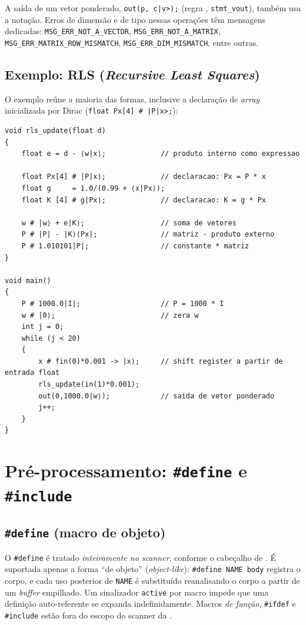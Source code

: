 A saída de um vetor ponderado, \lstinline+out(p, c|v>);+ (regra ,
\lstinline|stmt_vout|), também usa a notação. Erros de dimensão e de tipo nessas
operações têm mensagens dedicadas: \lstinline|MSG_ERR_NOT_A_VECTOR|,
\lstinline|MSG_ERR_NOT_A_MATRIX|, \lstinline|MSG_ERR_MATRIX_ROW_MISMATCH|,
\lstinline|MSG_ERR_DIM_MISMATCH|, entre outras.

\subsection{Exemplo: RLS (\emph{Recursive Least Squares})}

O exemplo  reúne a maioria das
formas, inclusive a declaração de \emph{array} inicializada por Dirac
(\lstinline+float Px[4] # |P|x>;+):

\begin{lstlisting}[style=cmm]
void rls_update(float d)
{
    float e = d - ⟨w|x⟩;             // produto interno como expressao

    float Px[4] # |P|x⟩;             // declaracao: Px = P * x
    float g     = 1.0/(0.99 + ⟨x|Px⟩);
    float K [4] # g|Px⟩;             // declaracao: K = g * Px

    w # |w⟩ + e|K⟩;                  // soma de vetores
    P # |P| - |K⟩⟨Px|;               // matriz - produto externo
    P # 1.010101|P|;                 // constante * matriz
}

void main()
{
    P # 1000.0|I|;                   // P = 1000 * I
    w # |0⟩;                         // zera w
    int j = 0;
    while (j < 20)
    {
        x # fin(0)*0.001 -> |x⟩;     // shift register a partir de entrada float
        rls_update(in(1)*0.001);
        out(0,1000.0|w⟩);            // saida de vetor ponderado
        j++;
    }
}
\end{lstlisting}

\section{Pré-processamento: \texttt{\#define} e \texttt{\#include}}
\label{sec:cmm-preproc}

\subsection{\texttt{\#define} (macro de objeto)}

O \lstinline|#define| é tratado \emph{inteiramente no scanner}, conforme o
cabeçalho de . É suportada apenas a forma \enquote{de objeto}
(\emph{object-like}): \lstinline|#define NAME body| registra o corpo, e cada uso
posterior de \lstinline|NAME| é substituído reanalisando o corpo a partir de um
\emph{buffer} empilhado. Um sinalizador \lstinline|active| por macro impede que
uma definição auto-referente se expanda indefinidamente. Macros \emph{de função},
\lstinline|#ifdef| e \lstinline|#include| estão fora do escopo do scanner da
\cmm{}.

